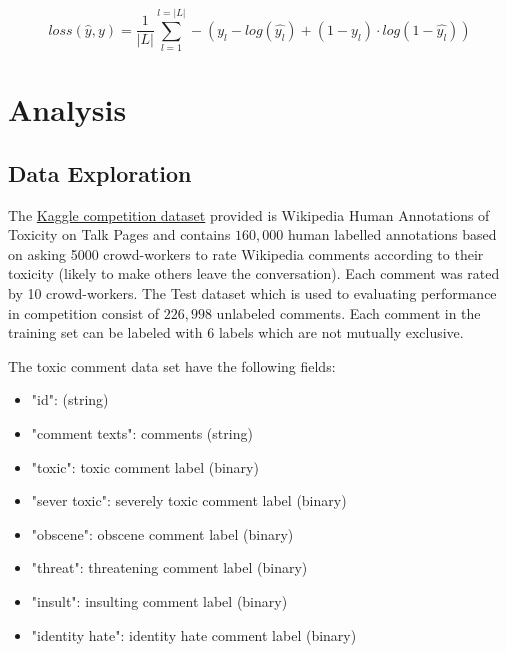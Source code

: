 \documentclass{article}
\begin{document}
    \begin{equation}
            loss(\hat{y}, y) = \frac{1}{|L|} \sum_{l=1}^{l=|L|} - (y_l - log(\hat{y_l}) + (1-y_l) \cdot log(1-\hat{y_l}))
    \end{equation}



\section{Analysis}

    \subsection{Data Exploration}

    The \href{https://www.kaggle.com/c/jigsaw-toxic-comment-classification-challenge/data}{Kaggle competition dataset} provided is Wikipedia Human Annotations of Toxicity on Talk Pages and contains $160,000$ human labelled annotations based on asking 5000 crowd-workers to rate Wikipedia comments according to their toxicity (likely to make others leave the conversation). Each comment was rated by 10 crowd-workers. The Test dataset which is used to evaluating performance in competition consist of $226,998$ unlabeled comments. Each comment in the training set can be labeled with $6$ labels which are not mutually exclusive.

    The toxic comment data set have the following fields:
    
    \begin{itemize}
        \item "id": (string)
        \item "comment texts": comments (string)
        \item "toxic": toxic comment label (binary)
        \item "sever toxic": severely toxic comment label (binary)
        \item "obscene": obscene comment label (binary)
        \item "threat": threatening comment label (binary)
        \item "insult": insulting comment label (binary)
        \item "identity hate": identity hate comment label (binary)
    \end{itemize}


\end{document}
